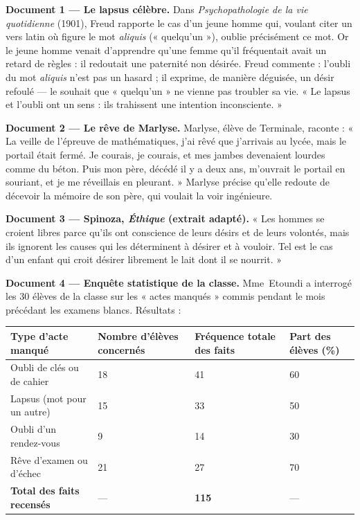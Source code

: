 \documentclass[11pt]{article}
\begin{document}
\textbf{Document 1 — Le lapsus célèbre.} Dans \emph{Psychopathologie de la vie quotidienne} (1901), Freud rapporte le cas d'un jeune homme qui, voulant citer un vers latin où figure le mot \emph{aliquis} (« quelqu'un »), oublie précisément ce mot. Or le jeune homme venait d'apprendre qu'une femme qu'il fréquentait avait un retard de règles : il redoutait une paternité non désirée. Freud commente : l'oubli du mot \emph{aliquis} n'est pas un hasard ; il exprime, de manière déguisée, un désir refoulé — le souhait que « quelqu'un » ne vienne pas troubler sa vie. « Le lapsus et l'oubli ont un sens : ils trahissent une intention inconsciente. »

\textbf{Document 2 — Le rêve de Marlyse.} Marlyse, élève de Terminale, raconte : « La veille de l'épreuve de mathématiques, j'ai rêvé que j'arrivais au lycée, mais le portail était fermé. Je courais, je courais, et mes jambes devenaient lourdes comme du béton. Puis mon père, décédé il y a deux ans, m'ouvrait le portail en souriant, et je me réveillais en pleurant. » Marlyse précise qu'elle redoute de décevoir la mémoire de son père, qui voulait la voir ingénieure.

\textbf{Document 3 — Spinoza, \emph{Éthique} (extrait adapté).} « Les hommes se croient libres parce qu'ils ont conscience de leurs désirs et de leurs volontés, mais ils ignorent les causes qui les déterminent à désirer et à vouloir. Tel est le cas d'un enfant qui croit désirer librement le lait dont il se nourrit. »

\textbf{Document 4 — Enquête statistique de la classe.} Mme~Etoundi a interrogé les 30 élèves de la classe sur les « actes manqués » commis pendant le mois précédant les examens blancs. Résultats :

\begin{center}
\begin{tabularx}{\linewidth}{|l|X|X|X|}\hline
\rowcolor{popblueL} \textbf{Type d'acte manqué} & \textbf{Nombre d'élèves concernés} & \textbf{Fréquence totale des faits} & \textbf{Part des élèves (\%)} \\ \hline
Oubli de clés ou de cahier & 18 & 41 & 60 \\ \hline
Lapsus (mot pour un autre) & 15 & 33 & 50 \\ \hline
Oubli d'un rendez-vous & 9 & 14 & 30 \\ \hline
Rêve d'examen ou d'échec & 21 & 27 & 70 \\ \hline
\rowcolor{popcream} \textbf{Total des faits recensés} & --- & \textbf{115} & --- \\ \hline
\end{tabularx}
\end{center}
\end{document}
